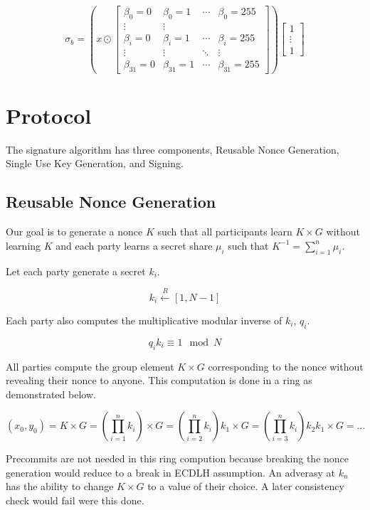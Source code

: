 \documentclass{article}
\begin{document}
$$\sigma_b = 
\left(x \odot \begin{bmatrix}
\beta_0 = 0 & \beta_0 = 1  & \cdots & \beta_0 = 255 \\
\vdots & \vdots \\
\beta_i = 0 & \beta_i = 1 & \cdots & \beta_i = 255  \\
\vdots & \vdots & \ddots & \vdots \\
\beta_{31} = 0 & \beta_{31} = 1 & \cdots & \beta_{31} = 255
\end{bmatrix}\right)
\begin{bmatrix}
1 \\ \vdots \\ 1
\end{bmatrix}
$$








\section{Protocol}

The signature algorithm has three components, Reusable Nonce Generation, Single Use Key Generation, and Signing.

\subsection{Reusable Nonce Generation}
Our goal is to generate a nonce $K$ such that all participants learn
$K\times G$ without learning $K$ and each party learns a secret share $\mu_i$ such that $K^{-1} = \sum_{i=1}^{n}\mu_i$.

Let each party generate a secret $k_i$.

$$k_i \xleftarrow{R} [1, N-1]$$

Each party also computes the multiplicative modular inverse of $k_i$, $q_i$. 

$$q_i k_i \equiv 1 \mod N$$

All parties compute the group element $K\times G$ corresponding to the nonce without revealing their nonce to anyone. This computation is done in a ring as demonstrated below.

$$(x_0, y_0) = K \times G = \left(\prod_{i=1}^n  k_i\right) \times G = \left(\prod_{i=2}^n k_i\right) k_1 \times G = \left(\prod_{i=3}^n k_i\right) k_2 k_1 \times G=\ldots$$

Precommits are not needed in this ring compution because breaking the nonce generation would reduce to a break in ECDLH assumption. An adverasy at $k_n$ has the ability to change $K\times G$ to a value of their choice. A later consistency check would fail were this done.
\end{document}
